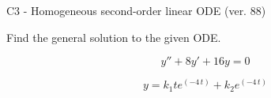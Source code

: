 \begin{exercise}
  \begin{exerciseTitle}C3 - Homogeneous second-order linear ODE (ver. 88)\end{exerciseTitle}
  \begin{exerciseStatement}
    
Find the general solution to the given ODE.

    
\[y''+8y'+16y = 0\]

  \end{exerciseStatement}
  \begin{exerciseAnswer}
    
\[y= k_{1} t e^{\left(-4 \, t\right)} + k_{2} e^{\left(-4 \, t\right)}\]

  \end{exerciseAnswer}
\end{exercise}